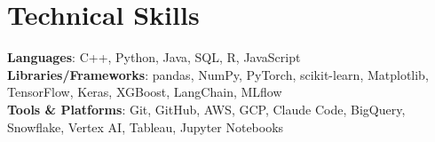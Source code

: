 \documentclass[letterpaper,11pt]{article}
\begin{document}
\section{Technical Skills}
 \begin{itemize}[leftmargin=0in, label={}]
    \small{\item{
     \textbf{Languages}{: C++, Python, Java, SQL, R, JavaScript} \\
     \textbf{Libraries/Frameworks}{: pandas, NumPy, PyTorch, scikit-learn, Matplotlib, TensorFlow, Keras, XGBoost, LangChain, MLflow} \\
     \textbf{Tools \& Platforms}{: Git, GitHub, AWS, GCP, Claude Code, BigQuery, Snowflake, Vertex AI, Tableau, Jupyter Notebooks}
    }}
 \end{itemize}
\end{document}
